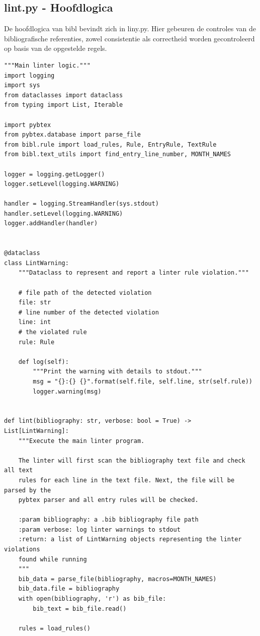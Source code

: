 \subsection{lint.py - Hoofdlogica}

De hoofdlogica van bibl bevindt zich in liny.py. 
Hier gebeuren de controles van de bibliografische referenties, zowel consistentie als correctheid worden gecontroleerd op basis van de opgestelde regels.

\begin{verbatim}
"""Main linter logic."""
import logging
import sys
from dataclasses import dataclass
from typing import List, Iterable

import pybtex
from pybtex.database import parse_file
from bibl.rule import load_rules, Rule, EntryRule, TextRule
from bibl.text_utils import find_entry_line_number, MONTH_NAMES

logger = logging.getLogger()
logger.setLevel(logging.WARNING)

handler = logging.StreamHandler(sys.stdout)
handler.setLevel(logging.WARNING)
logger.addHandler(handler)


@dataclass
class LintWarning:
    """Dataclass to represent and report a linter rule violation."""

    # file path of the detected violation
    file: str
    # line number of the detected violation
    line: int
    # the violated rule
    rule: Rule

    def log(self):
        """Print the warning with details to stdout."""
        msg = "{}:{} {}".format(self.file, self.line, str(self.rule))
        logger.warning(msg)


def lint(bibliography: str, verbose: bool = True) -> List[LintWarning]:
    """Execute the main linter program.

    The linter will first scan the bibliography text file and check all text
    rules for each line in the text file. Next, the file will be parsed by the
    pybtex parser and all entry rules will be checked.

    :param bibliography: a .bib bibliography file path
    :param verbose: log linter warnings to stdout
    :return: a list of LintWarning objects representing the linter violations
    found while running
    """
    bib_data = parse_file(bibliography, macros=MONTH_NAMES)
    bib_data.file = bibliography
    with open(bibliography, 'r') as bib_file:
        bib_text = bib_file.read()

    rules = load_rules()


\end{verbatim}
